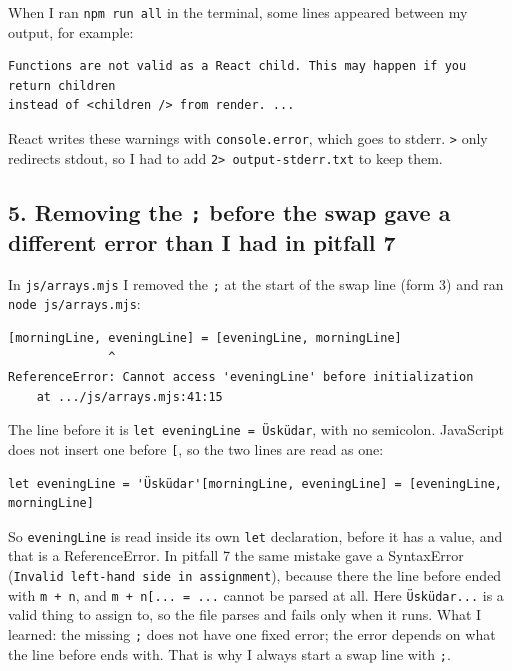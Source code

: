 \documentclass[
  10pt,
]{article}
\begin{document}
When I ran \texttt{npm\ run\ all} in the terminal, some lines appeared
between my output, for example:

\begin{verbatim}
Functions are not valid as a React child. This may happen if you return children
instead of <children /> from render. ...
\end{verbatim}

React writes these warnings with \texttt{console.\allowbreak{}error},
which goes to stderr. \texttt{\textgreater{}\allowbreak{}} only
redirects stdout, so I had to add
\texttt{2\textgreater{}\allowbreak{}\ output-stderr.\allowbreak{}txt} to
keep them.

\hypertarget{5-removing-the--before-the-swap-gave-a-different-error-than-i-had-in-pitfall-7}{%
\subsection{\texorpdfstring{5. Removing the \texttt{;} before the swap
gave a different error than I had in pitfall
7}{5. Removing the  before the swap gave a different error than I had in pitfall 7}}\label{5-removing-the--before-the-swap-gave-a-different-error-than-i-had-in-pitfall-7}}

In \texttt{js/\allowbreak{}arrays.\allowbreak{}mjs} I removed the
\texttt{;} at the start of the swap line (form 3) and ran
\texttt{node\ js/\allowbreak{}arrays.\allowbreak{}mjs}:

\begin{verbatim}
[morningLine, eveningLine] = [eveningLine, morningLine]
              ^
ReferenceError: Cannot access 'eveningLine' before initialization
    at .../js/arrays.mjs:41:15
\end{verbatim}

The line before it is
\texttt{let\ eveningLine\ =\ \allowbreak{}\textquotesingle{}Üsküdar\allowbreak{}\textquotesingle{}},
with no semicolon. JavaScript does not insert one before \texttt{{[}},
so the two lines are read as one:

\begin{verbatim}
let eveningLine = 'Üsküdar'[morningLine, eveningLine] = [eveningLine, morningLine]
\end{verbatim}

So \texttt{eveningLine} is read inside its own \texttt{let} declaration,
before it has a value, and that is a ReferenceError. In pitfall 7 the
same mistake gave a SyntaxError
(\texttt{Invalid\ left-hand\ side\ in\ assignment}), because there the
line before ended with \texttt{m\ +\ n}, and
\texttt{m\ +\ n{[}.\allowbreak{}.\allowbreak{}.\allowbreak{}{]\allowbreak{}}\ =\ .\allowbreak{}.\allowbreak{}.\allowbreak{}}
cannot be parsed at all. Here
\texttt{\allowbreak{}\textquotesingle{}Üsküdar\allowbreak{}\textquotesingle{}{[}.\allowbreak{}.\allowbreak{}.\allowbreak{}{]\allowbreak{}}}
is a valid thing to assign to, so the file parses and fails only when it
runs. What I learned: the missing \texttt{;} does not have one fixed
error; the error depends on what the line before ends with. That is why
I always start a swap line with \texttt{;}.
\end{document}
